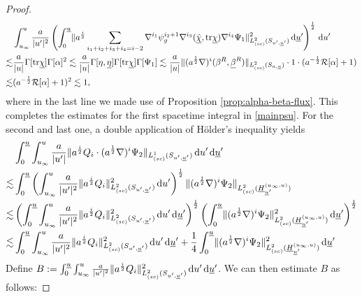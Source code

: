 \documentclass{amsart}
\newcommand{\Hbar}{\underline{H}}
\newcommand{\aln}{(\al \nabla)^i}
\newcommand{\ali}{a^{\frac{i}{2}}}
\newcommand{\tbeta}{\beta^R}
\newcommand{\tbetabar}{\betabar^R}
\newcommand{\dubarprime}{\hspace{.5mm} \text{d} \ubar^{\prime}}
\newcommand{\intu}{\int_{u_{\infty}}^u}
\newcommand{\intubar}{\int_0^{\ubar}}
\newcommand{\upr}{\lvert u^\prime \rvert}
\newcommand{\al}{a^{\frac{1}{2}}}
\newcommand{\chibar}{\underline{\chi}}
\newcommand{\chibarhat}{\underline{\hat{\chi}}}
\newcommand{\ubar}{\underline{u}}
\newcommand{\sumifim}{\sum_{i_1+i_2+i_3+i_4=i-2}}
\newcommand{\nablapp}{\nabla^{i_1}\psi_g^{i_2+1}}
\newcommand{\scaletwoSu}[1]{\lVert{#1} \rVert_{L^2_{(sc)}(S_{u,\ubar})}}
\newcommand{\scaleoneSuprimeubarprime}[1]{\lVert{#1} \rVert_{L^1_{(sc)}(S_{u^\prime,\ubar^\prime})}}
\newcommand{\scaletwoSuprimeubarprime}[1]{\lVert{#1} \rVert_{L^2_{(sc)}(S_{u^\prime,\ubar^\prime})}}
\newcommand{\betabar}{\underline{\beta}}
\newcommand{\etabar}{\underline{\eta}}
\newcommand{\duprime}{\hspace{.5mm} \text{d}u^{\prime}}
\newcommand{\nablat}{\nabla^{i_3}}
\newcommand{\nablaf}{\nabla^{i_4}}
\newcommand{\tr}{\mbox{tr}}
\begin{document}
{\begin{proof}
\begin{equation}
    \begin{split}
         &\intu \frac{a}{\upr^2} \left( \intubar \scaletwoSuprimeubarprime{\ali \sumifim \nablapp \nablat (\chibarhat,\tr\chibar) \nablaf \Psi_1}^2 \dubarprime \right)^{\frac{1}{2}} \duprime \\ \lesssim& \frac{a}{\lvert u \rvert} \Gamma[\tr\chibar]\Gamma[\alpha]^2\lesssim \frac{a}{\lvert u \rvert}\Gamma[\eta,\etabar] \Gamma[\tr\chibar]\Gamma[\Psi_1] \lesssim \frac{a}{\lvert u \rvert}\scaletwoSu{\aln(\tbeta,\tbetabar)} \cdot 1 \cdot (a^{-\frac{1}{2}}\mathcal{R}[\alpha]+1)\\ \lesssim & (a^{-\frac{1}{2}}\mathcal{R}[\alpha]+1)^2 \lesssim 1,
         \end{split}
\end{equation}
where in the last line we made use of Proposition \ref{prop:alpha-beta-flux}. This completes the estimates for the first spacetime integral in \eqref{mainpsu}. For the second and last one, a double application of H\"older's inequality yields
\begin{equation}
    \begin{split}
        &\intubar \intu  \frac{a}{\upr} \scaleoneSuprimeubarprime{\ali Q_i \cdot \aln \Psi_2 }  \duprime \dubarprime \\ \lesssim & \intubar \left( \intu \frac{a}{\upr^2} \scaletwoSuprimeubarprime{\ali Q_i}^2 \duprime \right)^{\frac{1}{2}} \lVert \aln \Psi_2 \rVert_{L^2_{(sc)}(\Hbar_{\ubar^{\prime}}^{(u_{\infty}, u)})} \\ \lesssim& \left(\intubar \intu \frac{a}{\upr^2} \scaletwoSuprimeubarprime{\ali Q_i}^2 \duprime \dubarprime \right)^{\frac{1}{2}} \left( \intubar \lVert \aln \Psi_2 \rVert^2_{L^2_{(sc)}(\Hbar_{\ubar^{\prime}}^{(u_{\infty}, u)})} \dubarprime \right)^{\frac{1}{2}} \\ \lesssim &\intubar \intu \frac{a}{\upr^2} \scaletwoSuprimeubarprime{\ali Q_i}^2 \duprime \dubarprime + \frac{1}{4} \intubar \lVert \aln \Psi_2 \rVert^2_{L^2_{(sc)}(\Hbar_{\ubar^{\prime}}^{(u_{\infty}, u)})} \dubarprime
    \end{split}
\end{equation}Define $B:= \intubar \intu \frac{a}{\upr^2} \scaletwoSuprimeubarprime{\ali Q_i}^2 \duprime \dubarprime$. We can then  estimate $B$ as follows:



\end{proof}}
\end{document}
